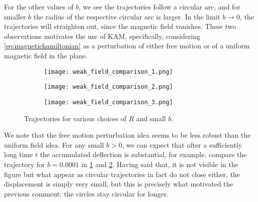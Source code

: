 For the other values of $b$, we see the trajectories follow a circular arc, and for smaller $b$ the radius of the respective circular arc is larger. In the limit $b\to0$, the trajectories will straighten out, since the magnetic field vanishes. These two observations motivates the use of KAM, specifically, considering \eqref{eq:magnetichamiltonian} as a perturbation of either free motion or of a uniform magnetic field in the plane.


\begin{figure}[!th]
\centering
\hfill
\begin{subfigure}[t]{0.30\textwidth}
\centering
\texttt{[image: weak\_field\_comparison\_1.png]}
\caption{}
\label{subfig:weakcomparisonA}
\end{subfigure}
\hfill
\begin{subfigure}[t]{0.30\textwidth}
\centering
\texttt{[image: weak\_field\_comparison\_2.png]}
\caption{}
\label{subfig:weakcomparisonB}
\end{subfigure}
\hfill
\begin{subfigure}[t]{0.30\textwidth}
\centering
\texttt{[image: weak\_field\_comparison\_3.png]}
\caption{}
\label{subfig:weakcomparisonC}
\end{subfigure}
\hfill
\caption{Trajectories for various choices of $R$ and small $b$.}
\label{fig:weakcomparison}
\end{figure}

We note that the free motion perturbation idea seems to be less robust than the uniform field idea. For any small $b>0$, we can expect that after a sufficiently long time $t$ the accumulated deflection is substantial, for example, compare the trajectory for $b=0.0001$ in \cref{subfig:weakcomparisonA} and \cref{subfig:weakcomparisonB}. Having said that, it is not visible in the figure but what appear as circular trajectories in fact do not close either, the displacement is simply very small, but this is precisely what motivated the previous comment: the circles stay circular for longer.